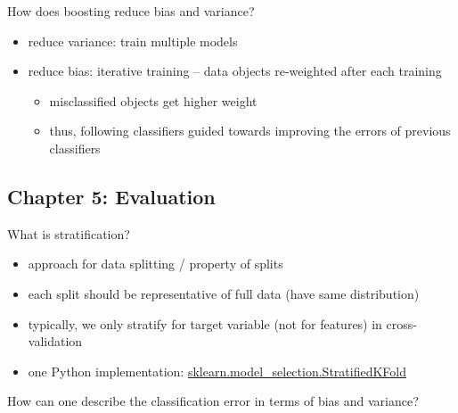\documentclass[12pt]{article}
\begin{document}
\begin{question}
	How does boosting reduce bias and variance?
\end{question}

\begin{itemize}[left=0pt, nosep]
	\item reduce variance: train multiple models
	\item reduce bias: iterative training -- data objects re-weighted after each training
	\begin{itemize}[left=0pt, nosep]
		\item misclassified objects get higher weight
		\item thus, following classifiers guided towards improving the errors of previous classifiers
	\end{itemize}
\end{itemize}

\newpage

\subsection*{Chapter 5: Evaluation}

\begin{question}
	What is stratification?
\end{question}

\begin{itemize}[left=0pt, nosep]
	\item approach for data splitting / property of splits
	\item each split should be representative of full data (have same distribution)
	\item typically, we only stratify for target variable (not for features) in cross-validation
	\item one Python implementation: \href{https://scikit-learn.org/stable/modules/generated/sklearn.model_selection.StratifiedKFold.html}{sklearn.model\_selection.StratifiedKFold}
\end{itemize}

\begin{question}
	How can one describe the classification error in terms of bias and variance?
\end{question}
\end{document}
